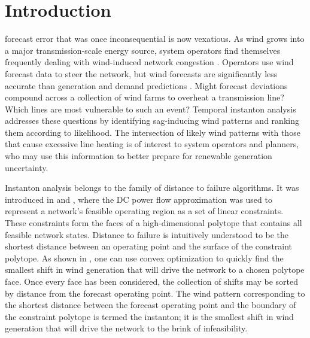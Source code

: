 \documentclass[journal,twoside]{IEEEtran}
\begin{document}
\section{Introduction}\label{sec:intro}
 forecast error that was once inconsequential is now vexatious. As wind grows into a major transmission-scale energy source, system operators find themselves frequently dealing with wind-induced network congestion \cite{rogers2010}. Operators use wind forecast data to steer the network, but wind forecasts are significantly less accurate than generation and demand predictions \cite{parsons2004}. Might forecast deviations compound across a collection of wind farms to overheat a transmission line? Which lines are most vulnerable to such an event? Temporal instanton analysis addresses these questions by identifying sag-inducing wind patterns and ranking them according to likelihood. The intersection of likely wind patterns with those that cause excessive line heating is of interest to system operators and planners, who may use this information to better prepare for renewable generation uncertainty.

Instanton analysis belongs to the family of distance to failure algorithms. It was introduced in \cite{chertkov2011} and \cite{chertkov2011a}, where the DC power flow approximation was used to represent a network's feasible operating region as a set of linear constraints. These constraints form the faces of a high-dimensional polytope that contains all feasible network states. Distance to failure is intuitively understood to be the shortest distance between an operating point and the surface of the constraint polytope. As shown in \cite{chertkov2011a}, one can use convex optimization to quickly find the smallest shift in wind generation that will drive the network to a chosen polytope face. Once every face has been considered, the collection of shifts may be sorted by distance from the forecast operating point. The wind pattern corresponding to the shortest distance between the forecast operating point and the boundary of the constraint polytope is termed the instanton; it is the smallest shift in wind generation that will drive the network to the brink of infeasibility.
\end{document}
